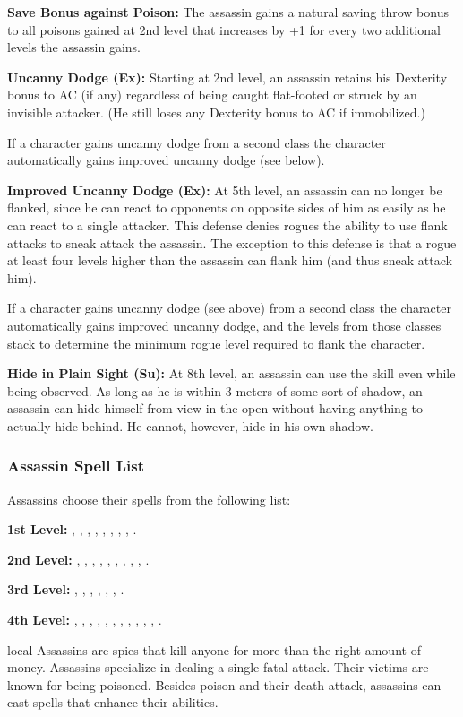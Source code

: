 {\textbf{Save Bonus against Poison:} The assassin gains a natural saving throw bonus to all poisons gained at 2nd level that increases by +1 for every two additional levels the assassin gains.

\textbf{Uncanny Dodge (Ex):} Starting at 2nd level, an assassin retains his Dexterity bonus to AC (if any) regardless of being caught flat-footed or struck by an invisible attacker. (He still loses any Dexterity bonus to AC if immobilized.)

If a character gains uncanny dodge from a second class the character automatically gains improved uncanny dodge (see below).

\textbf{Improved Uncanny Dodge (Ex):} At 5th level, an assassin can no longer be flanked, since he can react to opponents on opposite sides of him as easily as he can react to a single attacker. This defense denies rogues the ability to use flank attacks to sneak attack the assassin. The exception to this defense is that a rogue at least four levels higher than the assassin can flank him (and thus sneak attack him).

If a character gains uncanny dodge (see above) from a second class the character automatically gains improved uncanny dodge, and the levels from those classes stack to determine the minimum rogue level required to flank the character.

\textbf{Hide in Plain Sight (Su):} At 8th level, an assassin can use the  skill even while being observed. As long as he is within 3 meters of some sort of shadow, an assassin can hide himself from view in the open without having anything to actually hide behind. He cannot, however, hide in his own shadow.

\subsubsection{Assassin Spell List}
Assassins choose their spells from the following list:

\textbf{1st Level:} , , , , , , , , .

\textbf{2nd Level:} , , , , , , , , , .

\textbf{3rd Level:} ,  , , , , , .

\textbf{4th Level:} , , , , , , , , , , , .
}
{}
{local}
{Assassins are spies that kill anyone for more than the right amount of money.}
{Assassins specialize in dealing a single fatal attack. Their victims are known for being poisoned.}
{Besides poison and their death attack, assassins can cast spells that enhance their abilities.}